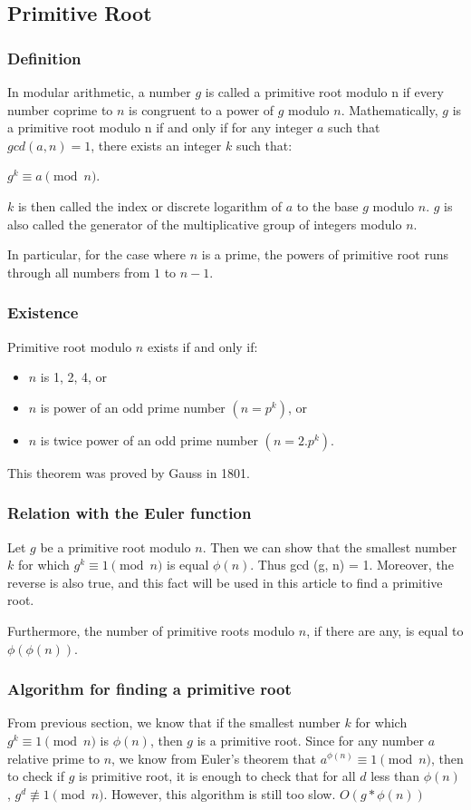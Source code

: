 \documentclass[8pt, a4paper, oneside, twocolumn]{extarticle}
\begin{document}
\subsection{Primitive Root}
\subsubsection{Definition}

In modular arithmetic, a number $g$ is called a primitive root modulo n if every number coprime to $n$ is congruent to a power of $g$ modulo $n$. Mathematically, $g$ is a primitive root modulo n if and only if for any integer $a$ such that $gcd(a, n) = 1$, there exists an integer $k$ such that:

$g^k \equiv a \pmod n$.

$k$ is then called the index or discrete logarithm of $a$ to the base $g$ modulo $n$. $g$ is also called the generator of the multiplicative group of integers modulo $n$.

In particular, for the case where $n$ is a prime, the powers of primitive root runs through all numbers from $1$ to $n-1$.
\subsubsection{Existence}

Primitive root modulo $n$ exists if and only if:
\begin{itemize}
    \item $n$ is 1, 2, 4, or
    \item $n$ is power of an odd prime number $(n = p^k)$, or
    \item $n$ is twice power of an odd prime number $(n = 2 . p^k)$.
\end{itemize}
This theorem was proved by Gauss in 1801.
\subsubsection{Relation with the Euler function}

Let $g$ be a primitive root modulo $n$. Then we can show that the smallest number $k$ for which $g^k \equiv 1 \pmod n$ is equal $\phi (n)$. Thus gcd (g, n) = 1. Moreover, the reverse is also true, and this fact will be used in this article to find a primitive root.

Furthermore, the number of primitive roots modulo $n$, if there are any, is equal to $\phi (\phi (n) )$.
\subsubsection{Algorithm for finding a primitive root}
From previous section, we know that if the smallest number $k$ for which $g^k \equiv 1 \pmod n$ is $\phi (n)$, then $g$ is a primitive root. Since for any number $a$ relative prime to $n$, we know from Euler's theorem that $a ^ { \phi (n) } \equiv 1 \pmod n$, then to check if $g$ is primitive root, it is enough to check that for all $d$ less than $\phi (n)$, $g^d \not \equiv 1 \pmod n$. However, this algorithm is still too slow. $O(g * \phi (n))$
\end{document}
